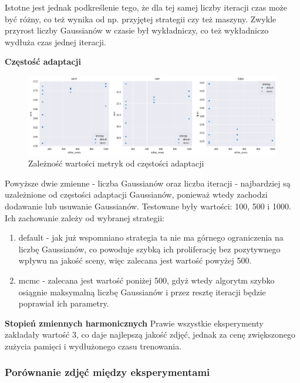 Istotne jest jednak podkreślenie tego, że dla tej samej liczby iteracji czas może być różny, co też wynika od np. przyjętej strategii czy też maszyny. Zwykle przyrost liczby Gaussianów w czasie był wykładniczy, co też wykładniczo wydłuża czas jednej iteracji. 

\textbf{Częstość adaptacji}

\begin{figure}[!h]
    \includegraphics[width=\linewidth]{img/refine_every_metrics.png}
    \caption{Zależność wartości metryk od częstości adaptacji}
    \label{fig:metrics_3}
\end{figure}

Powyższe dwie zmienne - liczba Gaussianów oraz liczba iteracji - najbardziej są uzależnione od częstości adaptacji Gaussianów, ponieważ wtedy zachodzi dodawanie lub usuwanie Gaussianów. Testowane były wartości: 100, 500 i 1000. Ich zachowanie zależy od wybranej strategii: 
\begin{enumerate}
    \item default - jak już wspomniano strategia ta nie ma górnego ograniczenia na liczbę Gaussianów, co powoduje szybką ich proliferację bez pozytywnego wpływu na jakość sceny, więc zalecana jest wartość powyżej 500.
    \item mcmc - zalecana jest wartość poniżej 500, gdyż wtedy algorytm szybko osiągnie maksymalną liczbę Gaussianów i przez resztę iteracji będzie poprawiał ich parametry.  
\end{enumerate}

\textbf{Stopień zmiennych harmonicznych}
Prawie wszystkie eksperymenty zakładały wartość 3, co daje najlepszą jakość zdjęć, jednak za cenę zwiększonego zużycia pamięci i wydłużonego czasu trenowania. 

\pagebreak

\subsubsection{Porównanie zdjęć między eksperymentami}

